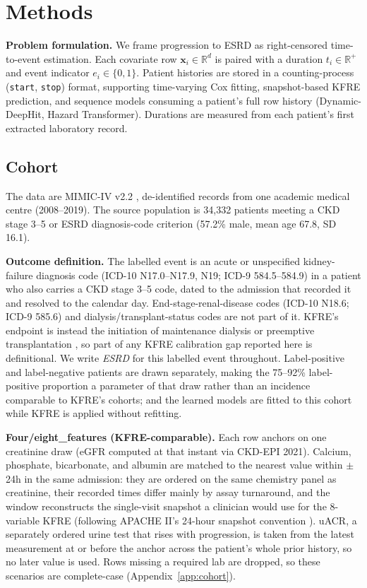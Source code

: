 \section{Methods}\label{sec:methods}

\textbf{Problem formulation.} We frame progression to ESRD as right-censored time-to-event estimation. Each covariate row $\boldsymbol{x}_i\in\mathbb{R}^d$ is paired with a duration $t_i\in\mathbb{R}^+$ and event indicator $e_i\in\{0,1\}$. Patient histories are stored in a counting-process (\texttt{start}, \texttt{stop}) format, supporting time-varying Cox fitting, snapshot-based KFRE prediction, and sequence models consuming a patient's full row history (Dynamic-DeepHit, Hazard Transformer). Durations are measured from each patient's first extracted laboratory record.

\subsection{Cohort} \label{sec:cohort}
The data are MIMIC-IV v2.2 \citep{mimiciv_v22,johnson2023mimic_ehr}, de-identified records from one academic medical centre (2008--2019). The source population is 34{,}332 patients meeting a CKD stage 3--5 or ESRD diagnosis-code criterion (57.2\% male, mean age 67.8, SD 16.1).

\textbf{Outcome definition.}\label{sec:outcome} The labelled event is an acute or unspecified kidney-failure diagnosis code (ICD-10 N17.0--N17.9, N19; ICD-9 584.5--584.9) in a patient who also carries a CKD stage 3--5 code, dated to the admission that recorded it and resolved to the calendar day. End-stage-renal-disease codes (ICD-10 N18.6; ICD-9 585.6) and dialysis/transplant-status codes are not part of it. KFRE's endpoint is instead the initiation of maintenance dialysis or preemptive transplantation \citep{tangri2011predicting,tangri2016multinational}, so part of any KFRE calibration gap reported here is definitional. We write \emph{ESRD} for this labelled event throughout. Label-positive and label-negative patients are drawn separately, making the 75--92\% label-positive proportion a parameter of that draw rather than an incidence comparable to KFRE's cohorts; and the learned models are fitted to this cohort while KFRE is applied without refitting.

\textbf{Four/eight\_features (KFRE-comparable).} Each row anchors on one creatinine draw (eGFR computed at that instant via CKD-EPI 2021). Calcium, phosphate, bicarbonate, and albumin are matched to the nearest value within $\pm$24h in the same admission: they are ordered on the same chemistry panel as creatinine, their recorded times differ mainly by assay turnaround, and the window reconstructs the single-visit snapshot a clinician would use for the 8-variable KFRE (following APACHE II's 24-hour snapshot convention \citep{knaus1985apacheii}). uACR, a separately ordered urine test that rises with progression, is taken from the latest measurement at or before the anchor across the patient's whole prior history, so no later value is used. Rows missing a required lab are dropped, so these scenarios are complete-case (Appendix~\ref{app:cohort}).


